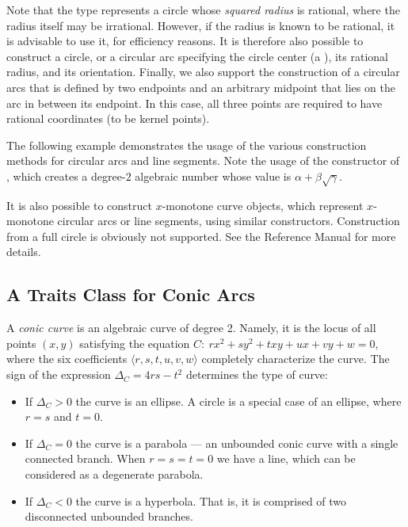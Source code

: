 Note that the  type represents a circle whose
\emph{squared radius} is rational, where the radius itself may be irrational.
However, if the radius is known to be rational, it is advisable to use it,
for efficiency reasons. It is therefore also possible to construct a circle,
or a circular arc specifying the circle center (a ), its
rational radius, and its orientation. Finally, we also support the construction
of a circular arcs that is defined by two endpoints and an arbitrary midpoint
that lies on the arc in between its endpoint. In this case, all three points
are required to have rational coordinates (to be kernel points).

The following example demonstrates the usage of the various construction
methods for circular arcs and line segments. Note the usage of the constructor
of , which creates a degree-$2$ algebraic
number whose value is $\alpha + \beta\sqrt{\gamma}$.


It is also possible to construct $x$-monotone curve objects, which represent
$x$-monotone circular arcs or line segments, using similar constructors.
Construction from a full circle is obviously not supported. See the Reference
Manual for more details.

\subsection{A Traits Class for Conic Arcs\label{arr_ssec:tr_conic}}

A {\em conic curve} is an algebraic curve of degree 2. Namely, it
is the locus of all points $(x,y)$ satisfying the equation $C:\ r
x^2 + s y^2 + t xy + u x + v y + w = 0$, where the six
coefficients $\langle r, s, t, u, v, w \rangle$ completely
characterize the curve. The sign of the expression $\Delta_{C} = 4
r s - t^2$ determines the type of curve:
\begin{itemize}
\item If $\Delta_{C} > 0$ the curve is an ellipse. A circle is a
special case of an ellipse, where $r = s$ and $t = 0$.
%
\item If $\Delta_{C} = 0$ the curve is a parabola --- an unbounded
conic curve with a single connected branch. When $r = s = t = 0$
we have a line, which can be considered as a degenerate parabola.
%
\item If $\Delta_{C} < 0$ the curve is a hyperbola. That is, it
is comprised of two disconnected unbounded branches.
\end{itemize}

